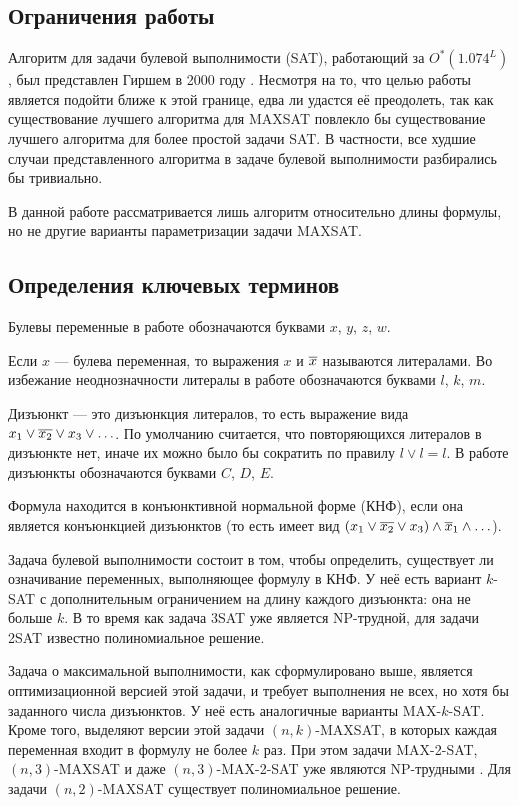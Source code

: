 \subsection*{Ограничения работы}

\firstpar{}Алгоритм для задачи булевой выполнимости (SAT), работающий за $O^*(1.074^L)$, был представлен Гиршем в 2000 году \cite{hirsch2000new}. Несмотря на то, что целью работы является подойти ближе к этой границе, едва ли удастся её преодолеть, так как существование лучшего алгоритма для MAXSAT повлекло бы существование лучшего алгоритма для более простой задачи SAT. В частности, все худшие случаи представленного алгоритма в задаче булевой выполнимости разбирались бы тривиально.

В данной работе рассматривается лишь алгоритм относительно длины формулы, но не другие варианты параметризации задачи MAXSAT.

\subsection*{Определения ключевых терминов}

\firstpar{}Булевы переменные в работе обозначаются буквами $x$, $y$, $z$, $w$.

Если $x$ — булева переменная, то выражения $x$ и $\overline{x}$ называются литералами. Во избежание неоднозначности литералы в работе обозначаются буквами $l$, $k$, $m$.

Дизъюнкт — это дизъюнкция литералов, то есть выражение вида $x_1 \vee \overline{x_2} \vee x_3 \vee \ldots$. По умолчанию считается, что повторяющихся литералов в дизъюнкте нет, иначе их можно было бы сократить по правилу $l \vee l = l$. В работе дизъюнкты обозначаются буквами $C$, $D$, $E$.

Формула находится в конъюнктивной нормальной форме (КНФ), если она является конъюнкцией дизъюнктов (то есть имеет вид $(x_1 \vee \overline{x_2} \vee x_3) \wedge \overline{x}_1 \wedge \ldots$).

Задача булевой выполнимости состоит в том, чтобы определить, существует ли означивание переменных, выполняющее формулу в КНФ. У неё есть вариант $k$-SAT с дополнительным ограничением на длину каждого дизъюнкта: она не больше $k$. В то время как задача 3SAT уже является NP-трудной, для задачи 2SAT известно полиномиальное решение.

Задача о максимальной выполнимости, как сформулировано выше, является оптимизационной версией этой задачи, и требует выполнения не всех, но хотя бы заданного числа дизъюнктов. У неё есть аналогичные варианты MAX-$k$-SAT. Кроме того, выделяют версии этой задачи $(n,k)$-MAXSAT, в которых каждая переменная входит в формулу не более $k$ раз. При этом задачи MAX-2-SAT, $(n,3)$-MAXSAT и даже $(n,3)$-MAX-2-SAT уже являются NP-трудными \cite{raman1998simplified}. Для задачи $(n,2)$-MAXSAT существует полиномиальное решение.


